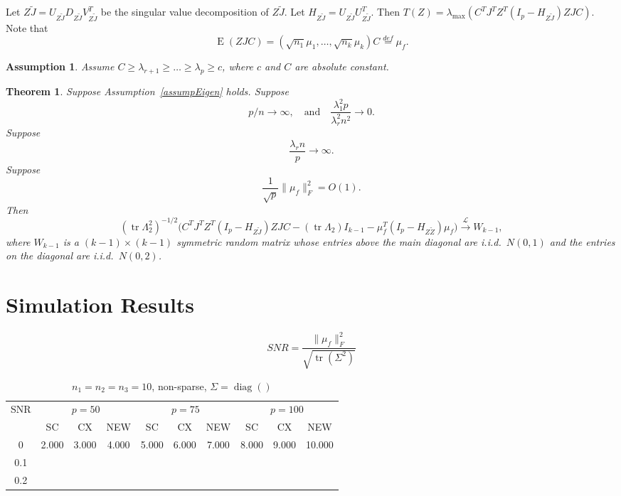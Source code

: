 \documentclass[review]{elsarticle}
\DeclareMathOperator{\mytr}{tr}
\DeclareMathOperator{\mydiag}{diag}
\DeclareMathOperator{\myE}{E}
\theoremstyle{plain}
\newtheorem{theorem}{\quad\quad Theorem}
\newtheorem{assumption}{\quad\quad Assumption}
\theoremstyle{definition}
\theoremstyle{remark}
\begin{document}
Let $Z\tilde{J}=U_{Z\tilde{J}}D_{Z\tilde{J}}V_{Z\tilde{J}}^T$ be the singular value decomposition of $Z\tilde{J}$. Let $H_{Z\tilde{J}}=U_{Z\tilde{J}}U_{Z\tilde{J}}^T$.
Then
$T(Z) = \lambda_{\max}(C^T J^T Z^T (I_p-H_{Z\tilde{J}})ZJC)$.
Note that
$$
\myE (ZJC) =(\sqrt{n_1}\mu_1,\ldots,\sqrt{n_k}\mu_k) C\overset{def}{=}\mu_{f}.
$$


\begin{assumption}\label{assumpEigen}
    Assume $C \geq \lambda_{r+1} \geq \ldots \geq \lambda_{p} \geq c$, where $c$ and $C$ are absolute constant.
\end{assumption}







\begin{theorem}\label{thm1}
    Suppose Assumption~\eqref{assumpEigen} holds. Suppose 
    \begin{equation}
    p/n\to \infty,\quad\textrm{and}\quad \frac{\lambda_1^2 p}{\lambda_r^2 n^2}\to 0.
    \end{equation}
    Suppose
    \begin{equation}
        \frac{\lambda_r n}{p}\to \infty.
    \end{equation}
    Suppose
    \begin{equation}
        \frac{1}{\sqrt{p}}\|\mu_f\|_F^2=O(1).
    \end{equation}
    Then
    \begin{equation}
        (\mytr \Lambda_2^2)^{-1/2}\big( C^TJ^T Z^T(I_p-H_{Z\tilde J}) ZJC-(\mytr \Lambda_2) I_{k-1} -\mu_f^T(I_p-H_{Z\tilde Z})\mu_f\big)\xrightarrow{\mathcal{L}} W_{k-1},
    \end{equation}
where $W_{k-1}$ is a $(k-1)\times(k-1)$ symmetric random matrix whose entries above the main diagonal are i.i.d.\ $N(0,1)$ and the entries on the diagonal are i.i.d.\ $N(0,2)$.
\end{theorem}

\section{Simulation Results}

$$
SNR=\frac{\|\mu_f\|_F^2}{\sqrt{\mytr (\Sigma^2)}}
$$
\begin{table}[!hbp]
    \caption[short]{$n_1=n_2=n_3=10$, non-sparse, $\Sigma=\mydiag()$}
    \centering
    \begin{tabular}{*{10}{c}}
    \toprule
    \multirow{2}{*}{SNR} &\multicolumn{3}{c}{$p=50$}&\multicolumn{3}{c}{$p=75$}&\multicolumn{3}{c}{$p=100$} \\
        \cmidrule(r){2-4}\cmidrule(r){5-7}\cmidrule(r){8-10}
        &SC & CX & NEW& SC & CX & NEW &SC & CX & NEW\\
    \midrule
        0& 2.000&3.000&4.000&5.000&6.000&7.000&8.000&9.000&10.000\\
    0.1\\
    0.2\\
    \bottomrule
\end{tabular}
\end{table}
\end{document}
